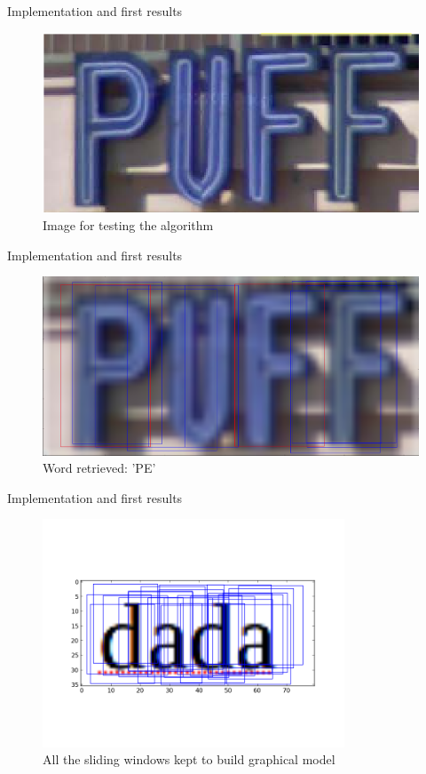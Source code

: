 \documentclass[handout]{beamer}
\begin{document}
\begin{frame}{Implementation and first results}
\begin{figure}%
\includegraphics[width=\columnwidth]{figures/puffTest.png}%
\caption{Image for testing the algorithm}%
\label{}%
\end{figure}
\end{frame}

\begin{frame}{Implementation and first results}
\begin{figure}%
\includegraphics[width=\columnwidth]{figures/puff.png}%
\caption{Word retrieved: 'PE'}%
\label{}%
\end{figure}
\end{frame}


\begin{frame}{Implementation and first results}
\begin{figure}%
\includegraphics[width=9cm]{figures/dada2.png}%
\caption{All the sliding windows kept to build graphical model}%
\label{}%
\end{figure}
\end{frame}
\end{document}
